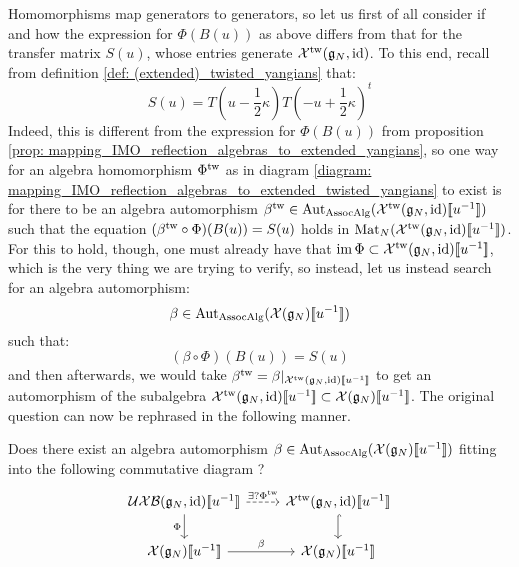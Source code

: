             Homomorphisms map generators to generators, so let us first of all consider if and how the expression for $\Phi( B(u) )$ as above differs from that for the transfer matrix $S(u)$, whose entries generate $\mathcal{X}^{\mathrm{tw}}(\mathfrak{g}_N, \mathrm{id})$. To this end, recall from definition \ref{def: (extended)_twisted_yangians} that:
                $$S(u) = T\left(u - \frac12 \kappa\right) T\left(-u + \frac12 \kappa\right)^t$$
            Indeed, this is different from the expression for $\Phi(B(u))$ from proposition \ref{prop: mapping_IMO_reflection_algebras_to_extended_yangians}, so one way for an algebra homomorphism $\Phi^{\mathrm{tw}}$ as in diagram \eqref{diagram: mapping_IMO_reflection_algebras_to_extended_twisted_yangians} to exist is for there to be an algebra automorphism $\beta^{\mathrm{tw}} \in \mathrm{Aut}_{\mathrm{Assoc}\mathrm{Alg}}( \mathcal{X}^{\mathrm{tw}}(\mathfrak{g}_N, \mathrm{id})[\![u^{-1}]\!] )$ such that the equation $(\beta^{\mathrm{tw}} \circ \Phi)( B(u) ) = S(u)$ holds in $\mathrm{Mat}_N(\mathcal{X}^{\mathrm{tw}}(\mathfrak{g}_N, \mathrm{id})[\![u^{-1}]\!])$. For this to hold, though, one must already have that $\operatorname{im} \Phi \subset \mathcal{X}^{\mathrm{tw}}( \mathfrak{g}_N, \mathrm{id} )[\![u^{-1}]\!]$, which is the very thing we are trying to verify, so instead, let us instead search for an algebra automorphism:
                $$\beta \in \mathrm{Aut}_{\mathrm{Assoc}\mathrm{Alg}}( \mathcal{X}(\mathfrak{g}_N)[\![u^{-1}]\!] )$$
            such that:
                \begin{equation} \label{equation: B_matrix_S_matrix_compatibility}
                    (\beta \circ \Phi)( B(u) ) = S(u)
                \end{equation}
            and then afterwards, we would take $\beta^{\mathrm{tw}} = \beta|_{ \mathcal{X}^{\mathrm{tw}}( \mathfrak{g}_N, \mathrm{id} )[\![u^{-1}]\!] }$ to get an automorphism of the subalgebra $\mathcal{X}^{\mathrm{tw}}(\mathfrak{g}_N, \mathrm{id})[\![u^{-1}]\!] \subset \mathcal{X}(\mathfrak{g}_N)[\![u^{-1}]\!]$. The original question can now be rephrased in the following manner.
            \begin{question}
                Does there exist an algebra automorphism $\beta \in \mathrm{Aut}_{\mathrm{Assoc}\mathrm{Alg}}( \mathcal{X}(\mathfrak{g}_N)[\![u^{-1}]\!] )$ fitting into the following commutative diagram ?
                    \begin{equation} \label{diagram: mapping_IMO_reflection_algebras_to_extended_twisted_yangians_via_untwisted_automorphisms}
                        \begin{tikzcd}
                    	{\UXB(\g_N, \id)[\![u^{-1}]\!]} & {\calX^{\tw}(\g_N, \id)[\![u^{-1}]\!]} \\
                    	{\calX(\g_N)[\![u^{-1}]\!]} & {\calX(\g_N)[\![u^{-1}]\!]}
                    	\arrow["{\exists ? \Phi^{\tw}}", dashed, from=1-1, to=1-2]
                    	\arrow["\Phi"', from=1-1, to=2-1]
                    	\arrow[hook, from=1-2, to=2-2]
                    	\arrow["\beta", from=2-1, to=2-2]
                        \end{tikzcd}
                    \end{equation}
            \end{question}
            
